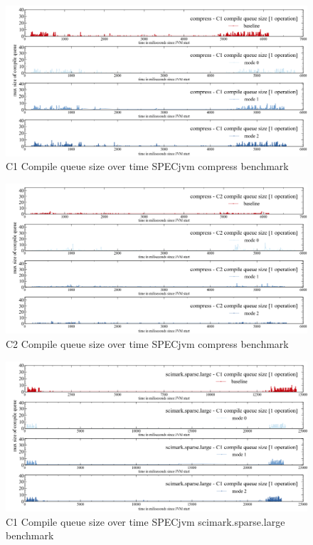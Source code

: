 \begin{figure}[ht]
  \begin{center}
    \centering
    \includegraphics[width=1.0\textwidth]{figures/spec_queue_compress_separate_c1.png}
    \caption{C1 Compile queue size over time SPECjvm compress benchmark}
    \label{f:spec_queue_compress_separate_c1}
  \end{center}
\end{figure}
\begin{figure}[ht]
  \begin{center}
    \centering
    \includegraphics[width=1.0\textwidth]{figures/spec_queue_compress_separate_c2.png}
    \caption{C2 Compile queue size over time SPECjvm compress benchmark}
    \label{f:spec_queue_compress_separate_c2}
  \end{center}
\end{figure}
\begin{figure}[ht]
  \begin{center}
    \centering
    \includegraphics[width=1.0\textwidth]{figures/spec_queue_scirmarksparselarge_separate_c1.png}
    \caption{C1 Compile queue size over time SPECjvm scimark.sparse.large benchmark}
    \label{f:spec_queue_scirmarksparselarge_separate_c1}
  \end{center}
\end{figure}
